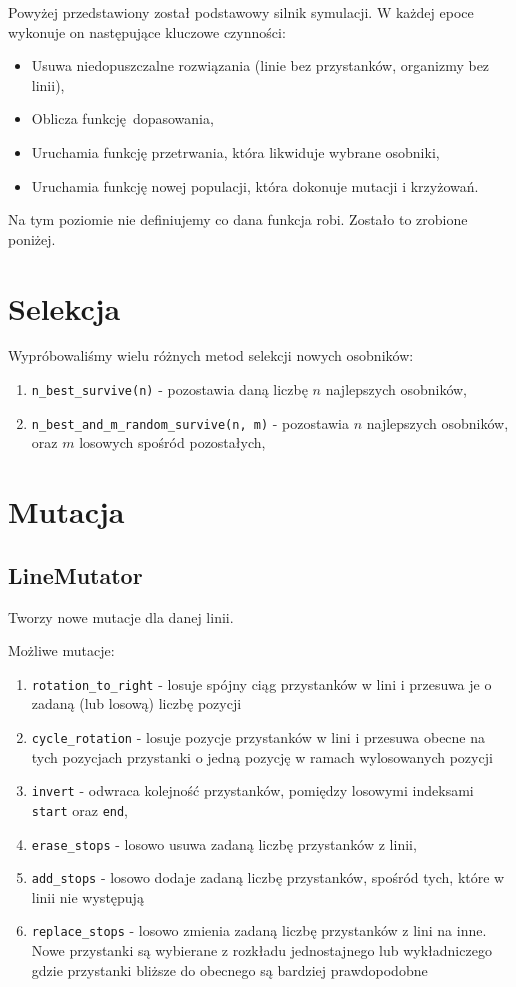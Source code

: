 \documentclass[12pt,a4paper,openright]{mwrep}
\begin{document}
	Powyżej przedstawiony został podstawowy silnik symulacji. W każdej epoce wykonuje on następujące kluczowe czynności:
	\begin{itemize}
		\item Usuwa niedopuszczalne rozwiązania (linie bez przystanków, organizmy bez linii),
		\item Oblicza funkcję dopasowania,
		\item Uruchamia funkcję przetrwania, która likwiduje wybrane osobniki,
		\item Uruchamia funkcję nowej populacji, która dokonuje mutacji i krzyżowań.
	\end{itemize}

	Na tym poziomie nie definiujemy co dana funkcja robi. Zostało to zrobione poniżej.

\section{Selekcja}
Wypróbowaliśmy wielu różnych metod selekcji nowych osobników:
\begin{enumerate}
    \item \lstinline{n_best_survive(n)} - pozostawia daną liczbę $n$ najlepszych osobników,
    \item \lstinline{n_best_and_m_random_survive(n, m)} - pozostawia $n$ najlepszych osobników, oraz $m$ losowych spośród pozostałych,
\end{enumerate}

\section{Mutacja}

\subsection{LineMutator}
Tworzy nowe mutacje dla danej linii.

Możliwe mutacje:

\begin{enumerate}
  \item \lstinline{rotation_to_right} - losuje spójny ciąg przystanków w lini i przesuwa je o zadaną (lub losową) liczbę pozycji
    \item \lstinline{cycle_rotation} - losuje pozycje przystanków w lini i przesuwa obecne na tych pozycjach przystanki o jedną pozycję w ramach wylosowanych pozycji
    \item \lstinline{invert} - odwraca kolejność przystanków, pomiędzy losowymi indeksami \lstinline{start} oraz \lstinline{end},
    \item \lstinline{erase_stops} - losowo usuwa zadaną liczbę przystanków z linii,
    \item \lstinline{add_stops} - losowo dodaje zadaną liczbę przystanków, spośród tych, które w linii nie występują
    \item \lstinline{replace_stops} - losowo zmienia zadaną liczbę przystanków z lini na inne. Nowe przystanki są wybierane z rozkładu jednostajnego lub wykładniczego gdzie przystanki bliższe do obecnego są bardziej prawdopodobne
\end{enumerate}
\end{document}
